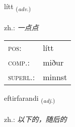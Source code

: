 \documentclass[frontgrid, backgrid]{flacards}\usepackage[]{graphicx}\usepackage[]{xcolor}
\begin{document}
\renewcommand{\flhead}{\vskip5pt \fboxsep=0pt {\small\bfseries\footnotesize Atviksorð | 副词}}
\renewcommand{\fcfoot}{\vskip5pt \fboxsep=0pt \hspace{2pt}{\small\bfseries\footnotesize 1K}}

\renewcommand{\blhead}{\vskip5pt {\small\bfseries\footnotesize Atviksorð | 副词 }}
\renewcommand{\bcfoot}{\vskip5pt \hspace{2pt}{\small\bfseries\footnotesize 1K}}


{lítt \small{\textsubscript{(\textit{adv.})}} \\[1ex] %
\textphonetic{[liht]} \\
zh.: \emph{一点点} \\  [2ex]
\renewcommand*{\arraystretch}{0.8}
\begin{tabular}{ll}
\textsc{pos}: & lítt \\ 
\textsc{comp.}: & miður \\ 
\textsc{superl.}: & minnst \\
\end{tabular}
}

\renewcommand{\flhead}{\vskip5pt \fboxsep=0pt {\small\bfseries\footnotesize Lýsingarorð | 形容词}}
\renewcommand{\fcfoot}{\vskip5pt \fboxsep=0pt \hspace{2pt}{\small\bfseries\footnotesize 1K}}

\renewcommand{\blhead}{\vskip5pt {\small\bfseries\footnotesize Lýsingarorð | 形容词 }}
\renewcommand{\bcfoot}{\vskip5pt \hspace{2pt}{\small\bfseries\footnotesize 1K}}


{eftirfarandi \small{\textsubscript{(\textit{adj.})}} \\[1ex] %
 \\
zh.: \emph{以下的，随后的} \\  [2ex]
\renewcommand*{\arraystretch}{0.8}
}
\end{document}
